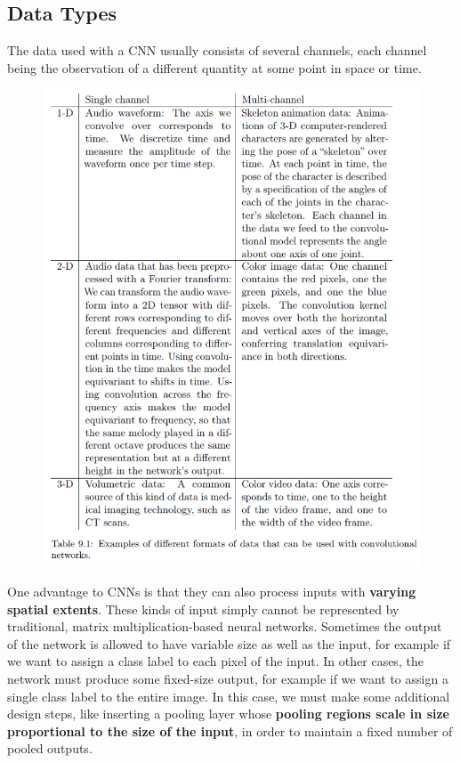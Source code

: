\begin{multicols}{2}
	\subsection{Data Types}
	The data used with a CNN usually consists of several channels, each channel being the observation of a different quantity at some point in space or time.
	\begin{figure}[H]
		\centering
		\includegraphics[width=\linewidth]{images/datatypes.png}
	\end{figure}

	One advantage to CNNs is that they can also process inputs with \textbf{varying spatial extents}.
	These kinds of input simply cannot be represented by traditional, matrix multiplication-based neural networks.
	Sometimes the output of the network is allowed to have variable size as well as the input, for example if we want to assign a class label to each pixel of the input.
	In other cases, the network must produce some fixed-size output, for example if we want to assign a single class label to the entire image. In this case, we must make some additional design steps, like inserting a pooling layer whose \textbf{pooling regions scale in size proportional to the size of the input}, in order to maintain a fixed number of pooled outputs.
	\columnbreak

\end{multicols}
